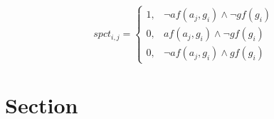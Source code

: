 \documentclass[a4paper]{article}
\begin{document}
\begin{equation}
spct_{i,j} =
\begin{cases}
1, & \text{$\neg af(a_j,g_i) \wedge \neg gf(g_i)$}\\
0, & \text{$af(a_j,g_i) \wedge \neg gf(g_i)$}\\
0, & \text{$\neg af(a_j,g_i) \wedge gf(g_i)$}
\end{cases}
\end{equation}

\section{Section}
\end{document}
